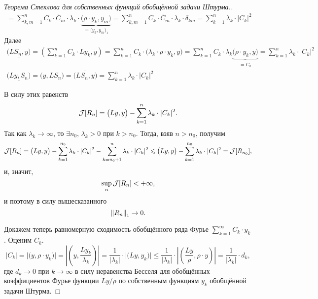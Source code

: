 \documentclass[12pt,a4paper,openany,fleqn]{book}
\newcommand{\J}{\ensuremath{\mathcal{J}}}
\newcommand{\norm}[1]{\ensuremath{\left\|#1\right\|}}
\theoremstyle{definition}
\begin{document}
\begin{proof}[Теорема Стеклова для собственных функций обобщённой задачи Штурма.]
\begin{multline*}
			=\sum\limits_{k,m=1}^n C_k\cdot\overline{C}_m\cdot\lambda_k\cdot\underbrace{\big(\rho\cdot y_k,y_m\big)}_{\textstyle=\big(y_k,y_m\big)_1}=\sum\limits_{k,m=1}^n C_k\cdot\overline{C}_m\cdot\lambda_k\cdot\delta_{km}=\sum\limits_{k=1}^n\lambda_k\cdot|C_k|^2
		\end{multline*}
		Далее
		\begin{gather*}
			\underline{\big(LS_n,y\big)}=\left(\sum\limits_{k=1}^n C_k\cdot Ly_k,y\right)=\sum\limits_{k=1}^nC_k\cdot\big(\lambda_k\cdot\rho\cdot y_k,y\big)=\sum\limits_{k=1}^n C_k\cdot\lambda_k\underbrace{\big(\rho\cdot y_k,y\big)}_{\textstyle=\overline{C}_k}=\sum\limits_{k=1}^n\lambda_k\cdot|C_k|^2\\
			\underline{\big(Ly,S_n\big)}=\big(y,LS_n\big)=\overline{\big(LS_n,y\big)}=\sum\limits_{k=1}^n\lambda_k\cdot|C_k|^2
		\end{gather*}
		
		В силу этих равенств
		\begin{equation*}
			\hfill\J[R_n]=\big(Ly,y\big)-\sum\limits_{k=1}^n\lambda_k\cdot|C_k|^2.\hfill
		\end{equation*}
		Так как $\lambda_k\to\infty$, то $\exists n_0$, $\lambda_k>0$ при $k>n_0$. Тогда, взяв $n>n_0$, получим 
		\begin{equation*}
			\hfill\J[R_n]=\big(Ly,y\big)-\sum\limits_{k=1}^{n_0}\lambda_k\cdot|C_k|^2-\sum\limits_{k=n_0+1}^n\lambda_k\cdot|C_k|^2\leqslant\big(Ly,y\big)-\sum\limits_{k=1}^{n_0}\lambda_k\cdot|C_k|^2=\J[R_{n_0}],\hfill
		\end{equation*}
		и, значит, 
		\begin{equation*}
			\hfill\sup\limits_{n}\J[R_n]<+\infty,\hfill
		\end{equation*}
		и поэтому в силу вышесказанного 
		\begin{equation*}
			\hfill\norm{R_n}_1\to0.\hfill
		\end{equation*}
	
		Докажем теперь равномерную сходимость обобщённого ряда Фурье $\displaystyle\sum\limits_{k=1}^{\infty}C_k\cdot y_k$. Оценим $C_k$.
		\begin{equation*}
			|C_k|=\big|\big(y,\rho\cdot y_k\big)\big|=\left|\left(y,\frac{Ly_k}{\lambda_k}\right)\right|=\frac1{|\lambda_k|}\cdot\big|\big(Ly,y_k\big)\big|\leqslant\frac1{|\lambda_k|}\cdot\left|\left(\frac{Ly}{\rho},\rho\cdot y\right)\right|=\frac1{|\lambda_k|}\cdot d_k,
		\end{equation*} 
		где $d_k\to0$ при $k\to\infty$ в силу неравенства Бесселя для обобщённых коэффициентов Фурье функции $Ly/\rho$ по собственным функциям $y_k$ обобщённой задачи Штурма.
		

\end{proof}
\end{document}
